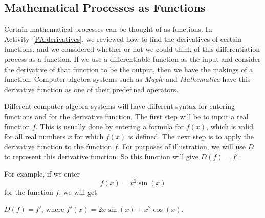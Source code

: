 \subsection*{Mathematical Processes as Functions}
Certain mathematical processes can be thought of as functions.  In \typeu Activity~\ref*{PA:derivatives}, we reviewed how to find the derivatives of certain functions, and we considered whether or not we could think of this differentiation process as a function.  If we use a differentiable function as the input and consider the derivative of that function to be the output, then we have the makings of a function.  Computer algebra systems such as \emph{Maple} and \textit{Mathematica} have this derivative function as one of their predefined operators.  %

Different computer algebra systems will have different syntax for entering functions and for the derivative function.   The first step will be to input a real function $f$.  This is usually done by entering a formula for $f(x)$, which is valid for all real numbers $x$ for which $f(x)$ is defined.  The next step is to apply the derivative function to the function $f$.  For purposes of illustration, we will use $D$ to represent this derivative function.  So this function will give $D(f) = f'$.

For example, if we enter
\[
f(x) = x^2 \sin (x) 
\]
for the function $f$, we will get
\begin{center}
$D(f) = f'$, where $f'(x) = 2x\sin \left( x \right) + x^2 \cos \left( x \right)$.
\end{center}

